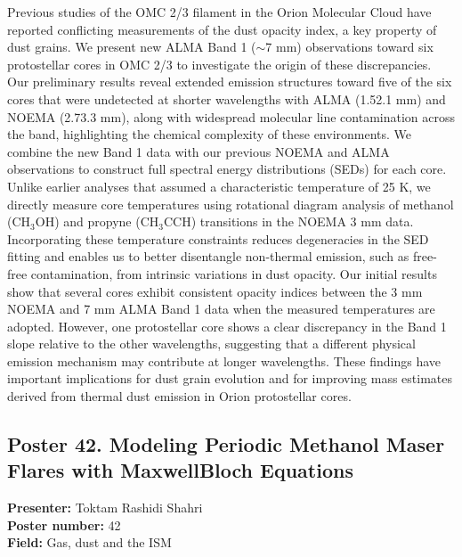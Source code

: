 Previous studies of the OMC 2/3 filament in the Orion Molecular Cloud have reported conflicting measurements of the dust opacity index, a key property of dust grains. We present new ALMA Band 1 ($\sim$7 mm) observations toward six protostellar cores in OMC 2/3 to investigate the origin of these discrepancies. Our preliminary results reveal extended emission structures toward five of the six cores that were undetected at shorter wavelengths with ALMA (1.52.1 mm) and NOEMA (2.73.3 mm), along with widespread molecular line contamination across the band, highlighting the chemical complexity of these environments. We combine the new Band 1 data with our previous NOEMA and ALMA observations to construct full spectral energy distributions (SEDs) for each core. Unlike earlier analyses that assumed a characteristic temperature of 25 K, we directly measure core temperatures using rotational diagram analysis of methanol (CH$_3$OH) and propyne (CH$_3$CCH) transitions in the NOEMA 3 mm data. Incorporating these temperature constraints reduces degeneracies in the SED fitting and enables us to better disentangle non-thermal emission, such as free-free contamination, from intrinsic variations in dust opacity. Our initial results show that several cores exhibit consistent opacity indices between the 3 mm NOEMA and 7 mm ALMA Band 1 data when the measured temperatures are adopted. However, one protostellar core shows a clear discrepancy in the Band 1 slope relative to the other wavelengths, suggesting that a different physical emission mechanism may contribute at longer wavelengths. These findings have important implications for dust grain evolution and for improving mass estimates derived from thermal dust emission in Orion protostellar cores.

\hypertarget{poster-abstract-talk-175}{}\label{poster-abstract-page-talk-175}
\subsection*{Poster 42. Modeling Periodic Methanol Maser Flares with MaxwellBloch Equations}
\textbf{Presenter:} Toktam Rashidi Shahri\\
\textbf{Poster number:} 42\\
\textbf{Field:} Gas, dust and the ISM

